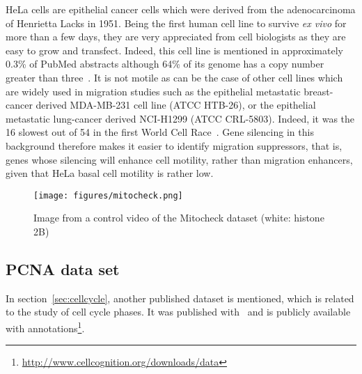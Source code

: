 HeLa cells are epithelial cancer cells which were derived from the adenocarcinoma of Henrietta Lacks in 1951. Being the first human cell line to survive \textit{ex vivo} for more than a few days, they are very appreciated from cell biologists as they are easy to grow and transfect. Indeed, this cell line is mentioned in approximately 0.3\% of PubMed abstracts although 64\% of its genome has a copy number greater than three~\cite{pmid23925245}. It is not motile as can be the case of other cell lines which are widely used in migration studies such as the epithelial metastatic breast-cancer derived MDA-MB-231 cell line (ATCC\up{\textregistered} HTB-26\texttrademark), or the epithelial metastatic lung-cancer derived NCI-H1299 (ATCC\up{\textregistered} CRL-5803\texttrademark). Indeed, it was the 16 slowest out of 54 in the first World Cell Race~\cite{pmid22974990}. Gene silencing in this background therefore makes it easier to identify migration suppressors, that is, genes whose silencing will enhance cell motility, rather than migration enhancers, given that HeLa basal cell motility is rather low.
\begin{figure*}[ht]
\centerline{\texttt{[image: figures/mitocheck.png]}}
\caption{Image from a control video of the Mitocheck dataset (white: histone 2B)}
\label{mitocheck}
\end{figure*}  
\subsection{PCNA data set}
In section~\ref{sec:cellcycle}, another published dataset is mentioned, which is related to the study of cell cycle phases. It was published with~\cite{cellcognition} and is publicly available with annotations\footnote{\href{http://www.cellcognition.org/downloads/data}{http://www.cellcognition.org/downloads/data}}.

